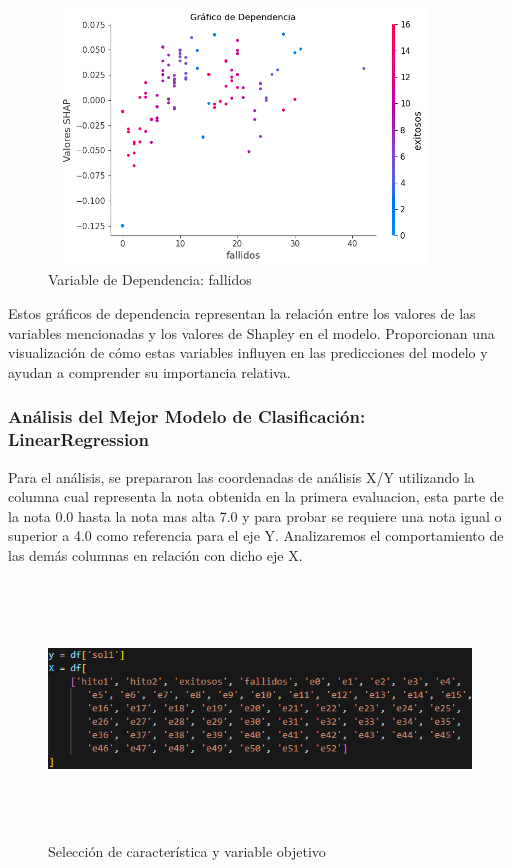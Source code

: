 \begin{figure}[H]
    \centering
    \includegraphics[width=4.0611in,height=2.6861in]{img/shap_rf/fallidos.png}
    \caption{Variable de Dependencia: fallidos}
    \label{fig:dependencia_fallidos}
\end{figure}

Estos gráficos de dependencia representan la relación entre los valores de las variables mencionadas y los valores de Shapley en el modelo. Proporcionan una visualización de cómo estas variables influyen en las predicciones del modelo y ayudan a comprender su importancia relativa.

\subsubsection{Análisis del Mejor Modelo de Clasificación: LinearRegression}

Para el análisis, se prepararon las coordenadas de análisis X/Y utilizando la columna  cual representa la nota obtenida en la primera evaluacion, esta parte de la nota 0.0 hasta la nota mas alta 7.0 y para probar se requiere una nota igual o superior a 4.0 como referencia para el eje Y. Analizaremos el comportamiento de las demás columnas en relación con dicho eje X.

\begin{figure}[H]
    \centering
    \includegraphics[width=5.0611in,height=2.6861in]{img/shap_lr/dependencia_variable_objetivo.png}
    \caption{Selección de característica y variable objetivo}
    \label{fig:variables_entrenamiento_lr}
\end{figure}

